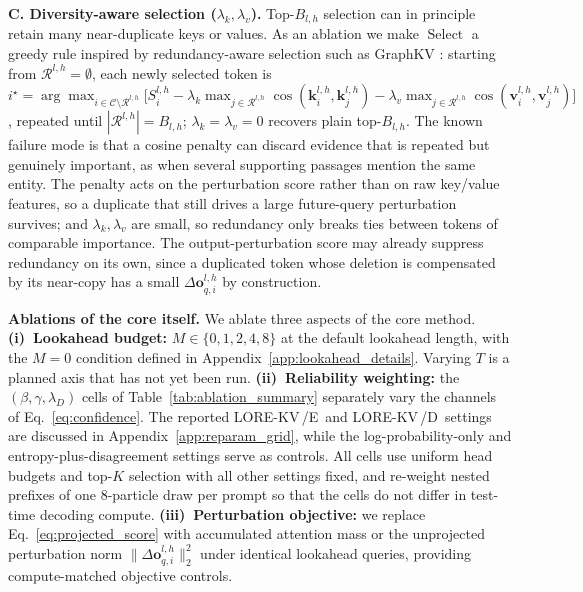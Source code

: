 \documentclass{article} %
\newcommand{\lorekvE}{LORE-KV\,/E}
\newcommand{\lorekvD}{LORE-KV\,/D}
\begin{document}
\textbf{C. Diversity-aware selection ($\lambda_k,\lambda_v$).}
\label{subsec:diversity}
Top-$B_{l,h}$ selection can in principle retain many near-duplicate keys or values. As an ablation we make $\operatorname{Select}$ a greedy rule inspired by redundancy-aware selection such as GraphKV \citep{li2025graphkv}: starting from $\mathcal{R}^{l,h}=\emptyset$, each newly selected token is $i^\star=\arg\max_{i\in\mathcal{C}\setminus\mathcal{R}^{l,h}}\big[S^{l,h}_{i}-\lambda_k\max_{j\in\mathcal{R}^{l,h}}\cos(\mathbf{k}^{l,h}_{i},\mathbf{k}^{l,h}_{j})-\lambda_v\max_{j\in\mathcal{R}^{l,h}}\cos(\mathbf{v}^{l,h}_{i},\mathbf{v}^{l,h}_{j})\big]$, repeated until $|\mathcal{R}^{l,h}|=B_{l,h}$; $\lambda_k=\lambda_v=0$ recovers plain top-$B_{l,h}$. The known failure mode is that a cosine penalty can discard evidence that is repeated but genuinely important, as when several supporting passages mention the same entity. The penalty acts on the perturbation score rather than on raw key/value features, so a duplicate that still drives a large future-query perturbation survives; and $\lambda_k,\lambda_v$ are small, so redundancy only breaks ties between tokens of comparable importance. The output-perturbation score may already suppress redundancy on its own, since a duplicated token whose deletion is compensated by its near-copy has a small $\Delta\mathbf{o}^{l,h}_{q,i}$ by construction.

\textbf{Ablations of the core itself.}
\label{subsec:core_ablations}
We ablate three aspects of the core method. \textbf{(i)~Lookahead budget:}
$M\in\{0,1,2,4,8\}$ at the default lookahead length, with the
$M{=}0$ condition defined in Appendix~\ref{app:lookahead_details}.
Varying $T$ is a planned axis that has not yet been run.
\textbf{(ii)~Reliability weighting:} the $(\beta,\gamma,\lambda_D)$
cells of Table~\ref{tab:ablation_summary} separately vary the channels
of Eq.~\ref{eq:confidence}. The reported \lorekvE\ and \lorekvD\
settings are discussed in Appendix~\ref{app:reparam_grid}, while the
log-probability-only and entropy-plus-disagreement settings serve as
controls. All cells use uniform head budgets and top-$K$ selection with
all other settings fixed, and re-weight nested prefixes of one
$8$-particle draw per prompt so that the cells do not differ in
test-time decoding compute.
\textbf{(iii)~Perturbation objective:} we replace
Eq.~\ref{eq:projected_score} with accumulated attention mass or the
unprojected perturbation norm
$\|\Delta\mathbf{o}^{l,h}_{q,i}\|_2^2$ under identical lookahead queries,
providing compute-matched objective controls.
\end{document}
